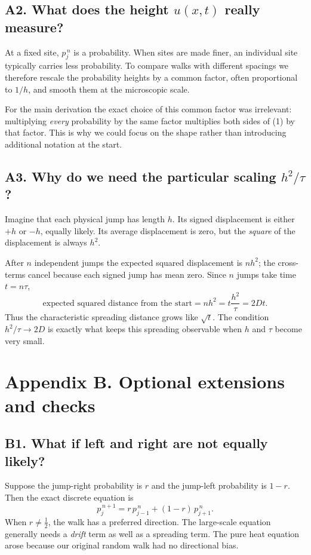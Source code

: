 \documentclass[11pt,a4paper]{article}
\begin{document}
\subsection*{A2. What does the height $u(x,t)$ really measure?}
At a fixed site, $p_j^{\,n}$ is a probability. When sites are made finer, an individual site typically carries less probability. To compare walks with different spacings we therefore rescale the probability heights by a common factor, often proportional to $1/h$, and smooth them at the microscopic scale.

For the main derivation the exact choice of this common factor was irrelevant: multiplying \emph{every} probability by the same factor multiplies both sides of (1) by that factor. This is why we could focus on the shape rather than introducing additional notation at the start.

\subsection*{A3. Why do we need the particular scaling $h^2/\tau$?}
Imagine that each physical jump has length $h$. Its signed displacement is either $+h$ or $-h$, equally likely. Its average displacement is zero, but the \emph{square} of the displacement is always $h^2$.

After $n$ independent jumps the expected squared displacement is $nh^2$; the cross-terms cancel because each signed jump has mean zero. Since $n$ jumps take time $t=n\tau$,
\[
\text{expected squared distance from the start}=nh^2=t\frac{h^2}{\tau}=2Dt.
\]
Thus the characteristic spreading distance grows like $\sqrt{t}$. The condition $h^2/\tau\to2D$ is exactly what keeps this spreading observable when $h$ and $\tau$ become very small.

\newpage
\section*{Appendix B. Optional extensions and checks}
\subsection*{B1. What if left and right are not equally likely?}
Suppose the jump-right probability is $r$ and the jump-left probability is $1-r$. Then the exact discrete equation is
\[
 p_j^{\,n+1}=r\,p_{j-1}^{\,n}+(1-r)\,p_{j+1}^{\,n}.
\]
When $r\neq\tfrac12$, the walk has a preferred direction. The large-scale equation generally needs a \emph{drift} term as well as a spreading term. The pure heat equation arose because our original random walk had no directional bias.
\end{document}
